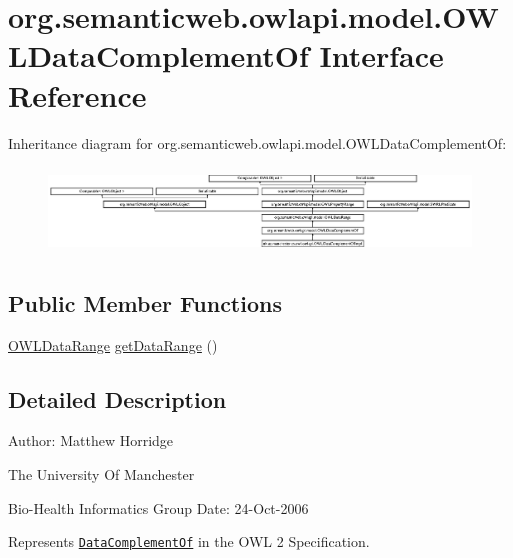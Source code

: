 \hypertarget{interfaceorg_1_1semanticweb_1_1owlapi_1_1model_1_1_o_w_l_data_complement_of}{\section{org.\-semanticweb.\-owlapi.\-model.\-O\-W\-L\-Data\-Complement\-Of Interface Reference}
\label{interfaceorg_1_1semanticweb_1_1owlapi_1_1model_1_1_o_w_l_data_complement_of}
}
Inheritance diagram for org.\-semanticweb.\-owlapi.\-model.\-O\-W\-L\-Data\-Complement\-Of\-:\begin{figure}[H]
\begin{center}
\leavevmode
\includegraphics[height=2.320442cm]{interfaceorg_1_1semanticweb_1_1owlapi_1_1model_1_1_o_w_l_data_complement_of}
\end{center}
\end{figure}
\subsection*{Public Member Functions}
\begin{DoxyCompactItemize}
\item 
\hyperlink{interfaceorg_1_1semanticweb_1_1owlapi_1_1model_1_1_o_w_l_data_range}{O\-W\-L\-Data\-Range} \hyperlink{interfaceorg_1_1semanticweb_1_1owlapi_1_1model_1_1_o_w_l_data_complement_of_a1a492de7f8112693285ce4d54194058c}{get\-Data\-Range} ()
\end{DoxyCompactItemize}


\subsection{Detailed Description}
Author\-: Matthew Horridge\par
 The University Of Manchester\par
 Bio-\/\-Health Informatics Group Date\-: 24-\/\-Oct-\/2006 

Represents \href{http://www.w3.org/TR/2009/REC-owl2-syntax-20091027/#Complement_of_Data_Ranges}{\tt Data\-Complement\-Of} in the O\-W\-L 2 Specification. 


